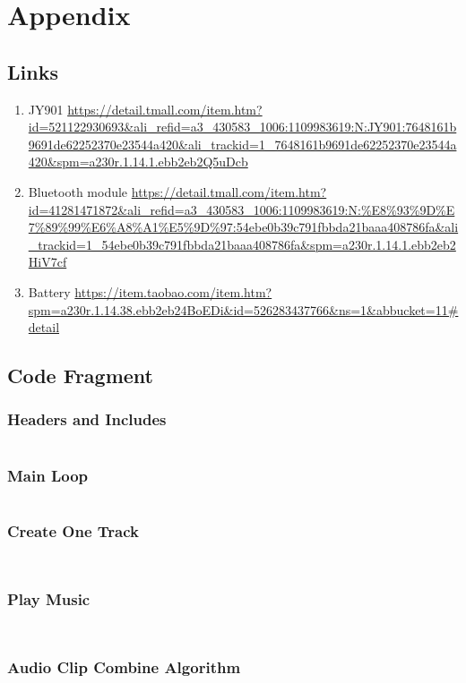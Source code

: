 \section{Appendix}

\subsection{Links}

\begin{enumerate}
\item JY901 
\url{https://detail.tmall.com/item.htm?id=521122930693&ali_refid=a3_430583_1006:1109983619:N:JY901:7648161b9691de62252370e23544a420&ali_trackid=1_7648161b9691de62252370e23544a420&spm=a230r.1.14.1.ebb2eb2Q5uDcb} 

\item  Bluetooth module 
\url{https://detail.tmall.com/item.htm?id=41281471872&ali_refid=a3_430583_1006:1109983619:N:%E8%93%9D%E7%89%99%E6%A8%A1%E5%9D%97:54ebe0b39c791fbbda21baaa408786fa&ali_trackid=1_54ebe0b39c791fbbda21baaa408786fa&spm=a230r.1.14.1.ebb2eb2HiV7cf}
\item  Battery 
\url{https://item.taobao.com/item.htm?spm=a230r.1.14.38.ebb2eb24BoEDi&id=526283437766&ns=1&abbucket=11#detail} 

\end{enumerate}

\newpage

\subsection{Code Fragment}

\subsubsection{Headers and Includes}
\inputminted{csharp}{scr/Headers.cs}


\subsubsection{Main Loop}
\inputminted{csharp}{scr/OnGui.cs}

\newpage

\subsubsection{Create One Track}
\inputminted{csharp}{scr/CreateOneTrack.cs}
\newpage
\inputminted{csharp}{scr/cot2.cs}


\subsubsection{Play Music}
\inputminted{csharp}{scr/PlayMusic.cs}
\newpage
\inputminted{csharp}{scr/pm2.cs}

\newpage

\subsubsection{Audio Clip Combine Algorithm}
\inputminted{csharp}{scr/ACCombine.cs}










